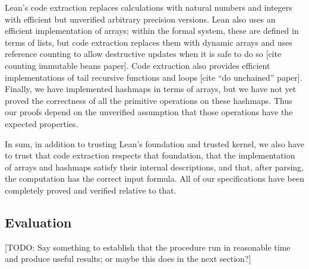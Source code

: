 Lean's code extraction replaces calculations with natural numbers and integers with
efficient but unverified arbitrary precision versions.
Lean also uses an efficient implementation of arrays; within the
formal system, these are defined in terms of lists, but code extraction replaces them
with dynamic arrays and uses reference counting to allow destructive updates when it is safe
to do so [cite counting immutable beans paper].
Code extraction also provides efficient implementations of tail recursive functions and loops
[cite ``do unchained'' paper].
Finally, we have implemented hashmaps in terms of arrays, but we have not yet proved
the correctness of all the primitive operations on these hashmaps.
Thus our proofs depend on the unverified assumption that those operations have the
expected properties.

In sum, in addition to trusting Lean's foundation and trusted kernel,
we also have to trust that code extraction respects that foundation,
that the implementation of arrays and hashmaps satisfy their internal descriptions,
and that, after parsing, the computation has the correct input formula.
All of our specifications have been completely proved and verified relative to that.

\subsection{Evaluation}

[TODO: Say something to establish that the procedure run in reasonable time and produce useful results; or maybe this does in the next section?]